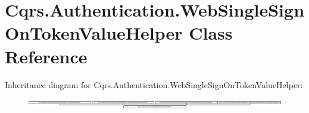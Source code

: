 \hypertarget{classCqrs_1_1Authentication_1_1WebSingleSignOnTokenValueHelper}{}\section{Cqrs.\+Authentication.\+Web\+Single\+Sign\+On\+Token\+Value\+Helper Class Reference}
\label{classCqrs_1_1Authentication_1_1WebSingleSignOnTokenValueHelper}
Inheritance diagram for Cqrs.\+Authentication.\+Web\+Single\+Sign\+On\+Token\+Value\+Helper\+:\begin{figure}[H]
\begin{center}
\leavevmode
\includegraphics[height=0.470588cm]{classCqrs_1_1Authentication_1_1WebSingleSignOnTokenValueHelper}
\end{center}
\end{figure}
